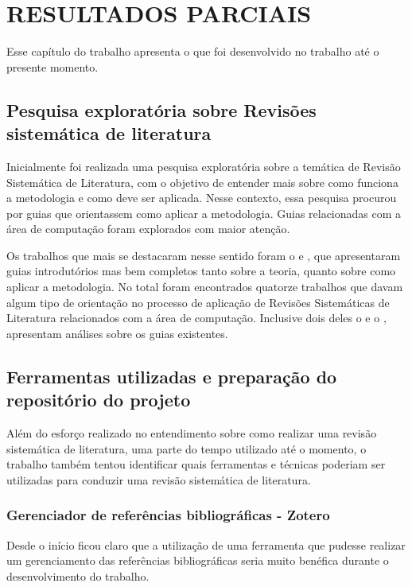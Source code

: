 
\chapter{RESULTADOS PARCIAIS}
\label{cap:resultados_parciais}

Esse capítulo do trabalho apresenta o que foi desenvolvido no trabalho até o presente momento.

\section{Pesquisa exploratória sobre Revisões sistemática de literatura}
Inicialmente foi realizada uma pesquisa exploratória sobre a temática de Revisão Sistemática de Literatura, com o objetivo de entender mais sobre como funciona a metodologia e como deve ser aplicada. Nesse contexto, essa pesquisa procurou por guias que orientassem como aplicar a metodologia. Guias relacionadas com a área de computação foram explorados com maior atenção. 

Os trabalhos que mais se destacaram nesse sentido foram o \cite{kitchenham2007guidelines} e \cite{keele_guidelines_2007}, que apresentaram guias introdutórios mas bem completos tanto sobre a teoria, quanto sobre como aplicar a metodologia. No total foram encontrados quatorze trabalhos que davam algum tipo de orientação no processo de aplicação de Revisões Sistemáticas de Literatura relacionados com a área de computação. Inclusive dois deles o \cite{bai_conducting_2019} e o \cite{oosterwyk_synthesis_2019}, apresentam análises sobre os guias existentes.

\section{Ferramentas utilizadas e preparação do repositório do projeto}

Além do esforço realizado no entendimento sobre como realizar uma revisão sistemática de literatura, uma parte do tempo utilizado até o momento, o trabalho também tentou identificar quais ferramentas e técnicas poderiam ser utilizadas para conduzir uma revisão sistemática de literatura.

\subsection{Gerenciador de referências bibliográficas - Zotero}
Desde o início ficou claro que a utilização de uma ferramenta que pudesse realizar um gerenciamento das referências bibliográficas seria muito benéfica durante o desenvolvimento do trabalho. 

